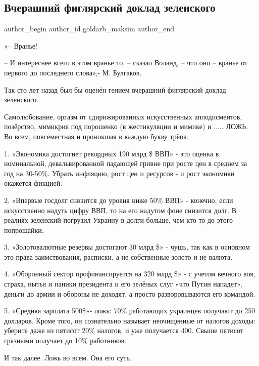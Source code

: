  
 
 
 
 
 
\subsection{Вчерашний фиглярский доклад зеленского}
\label{sec:02_12_2021.fb.goldarb_maksim.1.doklad_zelja_voland}
 
\ifcmt
 author_begin
   author_id goldarb_maksim
 author_end
\fi

«– Вранье!

– И интереснее всего в этом вранье то, – сказал Воланд, – что оно – вранье от
первого до последнего слова»,- М. Булгаков. 

Так сто лет назад был бы оценён гением вчерашний фиглярский доклад зеленского. 

Самолюбование, оргазм от сдирижированных искусственных аплодисментов,
позёрство, мимикрия под порошенко (в жестикуляции и мимике) и ..... ЛОЖЬ. Во
всем, повсеместная и проникшая в каждую букву трёпа. 

1. «Экономика достигнет рекордных 190 млрд \$ ВВП» - это оценка в номинальной,
девальвированной падающей гривне при росте цен в среднем за год на 30-50\%.
Убрать инфляцию, рост цен и ресурсов - и рост экономики окажется фикцией. 

2. «Впервые госдолг снизится до уровня ниже 50\% ВВП» - конечно, если
искусственно надуть цифру ВВП, то на его надутом фоне снизится долг. В реалиях
зеленский погрузил Украину в долги больше, чем кто-то до этого попрошайки. 

3. «Золотовалютные резервы достигают 30 млрд \$» - чушь, так как в основном это
права заимствования, расписки, а не собственные золото и не валюта.  

4. «Оборонный сектор профинансируется на 320 млрд \$» - с учетом вечного воя,
страха, нытья и паники президента и его зелёных слуг «что Путин нападет»,
деньги до армии и обороны не доходят, а просто разворовываются его командой. 

5. «Средняя зарплата 500\$»- ложь: 70\% работающих украинцев получают до 250
долларов. Кроме того, он сознательно называет неочищенные от налогов доходы:
уберите даже из пятисот 20\% налогов, и уже получается 400. Свыше пятисот
грязными получает до 10\% работников. 

И так далее. Ложь во всем. Она его суть.

